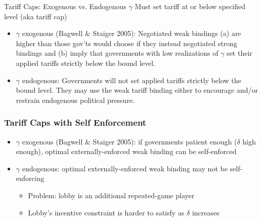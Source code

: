 \documentclass{beamer}
\newcommand{\bta}{\bm{\tau^a}}
\newcommand{\btn}{\bm{\tau^{tw}}}
\newcommand{\ga}{\gamma}
\newcommand{\de}{\delta}
\begin{document}
{\begin{frame}{Tariff Caps: Exogenous vs. Endogenous $\ga$}
\pause
Must set tariff at or below specified level (aka tariff cap)
\pause
\begin{itemize}[<+->]
	\item $\ga$ exogenous (Bagwell $\&$ Staiger 2005): Negotiated weak bindings (a) are higher than those gov'ts would choose if they instead negotiated strong bindings and (b) imply that governments with low realizations of $\ga$ set their applied tariffs strictly below the bound level.

	\item $\ga$ endogenous: Governments will not set applied tariffs strictly below the bound level. They may use the weak tariff binding either to encourage and/or restrain endogenous political pressure.

\end{itemize}
\end{frame}


\begin{frame}[label=self]
\frametitle{Tariff Caps with Self Enforcement}
\pause
\begin{itemize}[<+->]
	\item $\ga$ exogenous (Bagwell $\&$ Staiger 2005): if governments patient enough ($\de$ high enough), optimal externally-enforced weak binding can be self-enforced
  \item $\ga$ endogenous: optimal externally-enforced weak binding may not be self-enforcing
		\begin{itemize}
			\item Problem: lobby is an additional repeated-game player
			\item Lobby's incentive constraint is harder to satisfy as $\de$ increases
		\end{itemize}
	 
\end{itemize}
\pause
\hyperlink{repeated<1>}{}
\end{frame}




}
\end{document}
